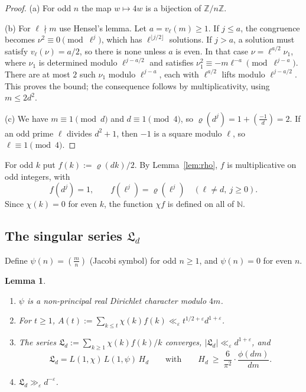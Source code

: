 \documentclass[11pt]{amsart}
\newtheorem{lemma}[theorem]{Lemma}
\theoremstyle{remark}
\theoremstyle{definition}
\numberwithin{equation}{section}
\newcommand{\Z}{\mathbb{Z}}
\newcommand{\N}{\mathbb{N}}
\newcommand{\eps}{\varepsilon}
\newcommand{\Lf}{\mathfrak{L}}
\newcommand{\leg}[2]{\left(\frac{#1}{#2}\right)}
\begin{document}
\begin{proof}
(a) For odd $n$ the map $w\mapsto 4w$ is a bijection of $\Z/n\Z$.

(b) For $\ell\nmid m$ use Hensel's lemma. Let $a=v_\ell(m)\ge1$. If $j\le a$, the congruence becomes $\nu^2\equiv0\pmod{\ell^j}$, which has $\ell^{\lfloor j/2\rfloor}$ solutions. If $j>a$, a solution must satisfy $v_\ell(\nu)=a/2$, so there is none unless $a$ is even. In that case $\nu=\ell^{a/2}\nu_1$, where $\nu_1$ is determined modulo $\ell^{j-a/2}$ and satisfies $\nu_1^2\equiv -m\ell^{-a}\pmod{\ell^{j-a}}$. There are at most $2$ such $\nu_1$ modulo $\ell^{j-a}$, each with $\ell^{a/2}$ lifts modulo $\ell^{j-a/2}$. This proves the bound; the consequence follows by multiplicativity, using $m\le 2d^2$.

(c) We have $m\equiv1\pmod d$ and $d\equiv1\pmod4$, so $\varrho(d^j)=1+\leg{-1}{d}=2$. If an odd prime $\ell$ divides $d^2+1$, then $-1$ is a square modulo $\ell$, so $\ell\equiv1\pmod 4$.
\end{proof}

For odd $k$ put $f(k):=\varrho(dk)/2$. By Lemma~\ref{lem:rho}, $f$ is multiplicative on odd integers, with
\begin{equation}\label{eq:f}
f(d^j)=1,\qquad f(\ell^j)=\varrho(\ell^j)\quad(\ell\neq d,\ j\ge0).
\end{equation}
Since $\chi(k)=0$ for even $k$, the function $\chi f$ is defined on all of $\N$.

\subsection{\texorpdfstring{The singular series $\Lf_d$}{The singular series L\_d}}
Define $\psi(n)=\leg{m}{n}$ (Jacobi symbol) for odd $n\ge1$, and $\psi(n)=0$ for even $n$.

\begin{lemma}\label{lem:L}
\begin{enumerate}
\item[(a)] $\psi$ is a non-principal real Dirichlet character modulo $4m$.
\item[(b)] For $t\ge1$, $A(t):=\sum_{k\le t}\chi(k)f(k)\ll_\eps t^{1/2+\eps}d^{1+\eps}$.
\item[(c)] The series $\Lf_d:=\sum_{k\ge1}\chi(k)f(k)/k$ converges, $|\Lf_d|\ll_\eps d^{1+\eps}$, and
\[
\Lf_d=L(1,\chi)\,L(1,\psi)\,H_d\qquad\text{with}\qquad H_d\ \ge\ \frac{6}{\pi^2}\cdot\frac{\phi(dm)}{dm}.
\]
\item[(d)] $\Lf_d\gg_\eps d^{-\eps}$.
\end{enumerate}
\end{lemma}
\end{document}
